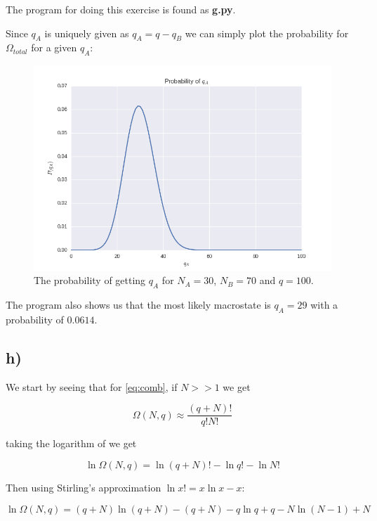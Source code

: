 \documentclass[a4paper,norsk, 10pt]{article}
\begin{document}
The program for doing this exercise is found as \textbf{g.py}.

Since $q_A$ is uniquely given as $q_A = q - q_B$ we can simply plot the probability for $\Omega_{total}$ for a given $q_A$:

\begin{figure}[H]
\centering
\includegraphics[scale=0.5]{gProb.png}
\caption{The probability of getting $q_A$ for $N_A = 30$, $N_B = 70$ and $q = 100$.}
\end{figure}

The program also shows us that the most likely macrostate is $q_A = 29$ with a probability of $0.0614$.

\subsection{h)}
We start by seeing that for \ref{eq:comb}, if $N>>1$ we get

\begin{equation}
\Omega(N,q) \approx \frac{(q+N)!}{q!N!}
\end{equation}


taking the logarithm of  we get

\begin{equation}
\ln \Omega(N,q) = \ln (q + N)! - \ln q! - \ln N!
\end{equation}

Then using Stirling's approximation $ \ln x! = x\ln x - x$:

\begin{equation}
\ln \Omega(N,q) = (q+N)\ln (q + N) - (q+N) - q\ln q + q - N\ln (N-1) +N
\end{equation}
\end{document}
